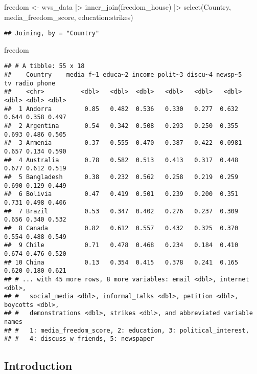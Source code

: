 \documentclass[
]{article}
\newenvironment{Shaded}{\begin{snugshade}}{\end{snugshade}}
\newcommand{\FunctionTok}[1]{\textcolor[rgb]{0.00,0.00,0.00}{#1}}
\newcommand{\NormalTok}[1]{#1}
\newcommand{\OtherTok}[1]{\textcolor[rgb]{0.56,0.35,0.01}{#1}}
\newcommand{\SpecialCharTok}[1]{\textcolor[rgb]{0.00,0.00,0.00}{#1}}
\begin{document}
\begin{Shaded}
\begin{Highlighting}[]
\NormalTok{freedom }\OtherTok{\textless{}{-}}\NormalTok{ wvs\_data }\SpecialCharTok{|\textgreater{}}
  \FunctionTok{inner\_join}\NormalTok{(freedom\_house) }\SpecialCharTok{|\textgreater{}}
  \FunctionTok{select}\NormalTok{(Country, media\_freedom\_score, education}\SpecialCharTok{:}\NormalTok{strikes)}
\end{Highlighting}
\end{Shaded}

\begin{verbatim}
## Joining, by = "Country"
\end{verbatim}

\begin{Shaded}
\begin{Highlighting}[]
\NormalTok{freedom}
\end{Highlighting}
\end{Shaded}

\begin{verbatim}
## # A tibble: 55 x 18
##    Country    media_f~1 educa~2 income polit~3 discu~4 newsp~5    tv radio phone
##    <chr>          <dbl>   <dbl>  <dbl>   <dbl>   <dbl>   <dbl> <dbl> <dbl> <dbl>
##  1 Andorra         0.85   0.482  0.536   0.330   0.277  0.632  0.644 0.358 0.497
##  2 Argentina       0.54   0.342  0.508   0.293   0.250  0.355  0.693 0.486 0.505
##  3 Armenia         0.37   0.555  0.470   0.387   0.422  0.0981 0.657 0.134 0.590
##  4 Australia       0.78   0.582  0.513   0.413   0.317  0.448  0.677 0.612 0.519
##  5 Bangladesh      0.38   0.232  0.562   0.258   0.219  0.259  0.690 0.129 0.449
##  6 Bolivia         0.47   0.419  0.501   0.239   0.200  0.351  0.731 0.498 0.406
##  7 Brazil          0.53   0.347  0.402   0.276   0.237  0.309  0.656 0.340 0.532
##  8 Canada          0.82   0.612  0.557   0.432   0.325  0.370  0.554 0.488 0.549
##  9 Chile           0.71   0.478  0.468   0.234   0.184  0.410  0.674 0.476 0.520
## 10 China           0.13   0.354  0.415   0.378   0.241  0.165  0.620 0.180 0.621
## # ... with 45 more rows, 8 more variables: email <dbl>, internet <dbl>,
## #   social_media <dbl>, informal_talks <dbl>, petition <dbl>, boycotts <dbl>,
## #   demonstrations <dbl>, strikes <dbl>, and abbreviated variable names
## #   1: media_freedom_score, 2: education, 3: political_interest,
## #   4: discuss_w_friends, 5: newspaper
\end{verbatim}

\hypertarget{introduction}{%
\subsection{Introduction}\label{introduction}}
\end{document}
